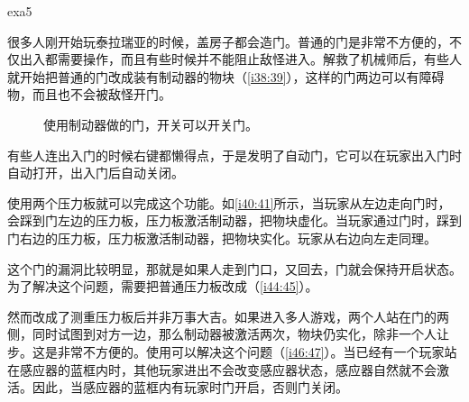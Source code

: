 \begin{example}{}{exa5}

很多人刚开始玩泰拉瑞亚的时候，盖房子都会造门。普通的门是非常不方便的，不仅出入都需要操作，而且有些时候并不能阻止敌怪进入。解救了机械师后，有些人就开始把普通的门改成装有制动器的物块（\autoref{i38:39}），这样的门两边可以有障碍物，而且也不会被敌怪开门。

\begin{figure}[H]
\centering
{}%
%
\caption{使用制动器做的门，开关可以开关门。}
\label{i38:39}
\end{figure}

有些人连出入门的时候右键都懒得点，于是发明了自动门，它可以在玩家出入门时自动打开，出入门后自动关闭。

使用两个压力板就可以完成这个功能。如\autoref{i40:41}所示，当玩家从左边走向门时，会踩到门左边的压力板，压力板激活制动器，把物块虚化。当玩家通过门时，踩到门右边的压力板，压力板激活制动器，把物块实化。玩家从右边向左走同理。

\begin{figure}[H]
\centering
{}%
%
\caption{}
\label{i40:41}
\end{figure}

这个门的漏洞比较明显，那就是如果人走到门口，又回去，门就会保持开启状态。为了解决这个问题，需要把普通压力板改成（\autoref{i44:45}）。

\begin{figure}[H]
\centering
{}%
%
\caption{}
\label{i44:45}
\end{figure}

然而改成了测重压力板后并非万事大吉。如果进入多人游戏，两个人站在门的两侧，同时试图到对方一边，那么制动器被激活两次，物块仍实化，除非一个人让步。这是非常不方便的。使用可以解决这个问题（\autoref{i46:47}）。当已经有一个玩家站在感应器的蓝框内时，其他玩家进出不会改变感应器状态，感应器自然就不会激活。因此，当感应器的蓝框内有玩家时门开启，否则门关闭。

\begin{figure}[H]
\centering
{}%
%
\caption{}
\label{i46:47}
\end{figure}
\end{example}

